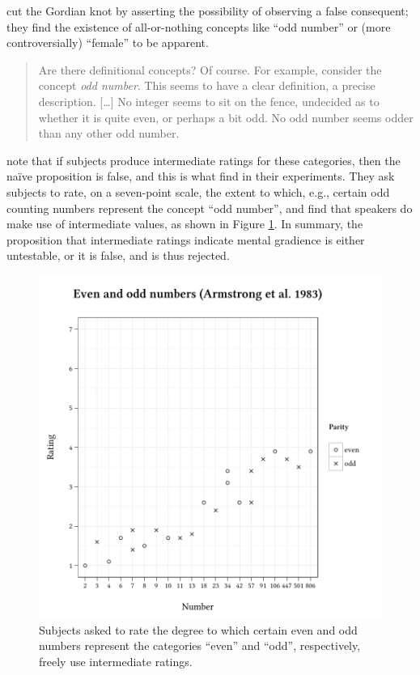\citet{Armstrong1983} cut the Gordian knot by asserting the possibility of observing a false consequent; they find the existence of all-or-nothing concepts like ``odd number'' or (more controversially) ``female'' to be apparent.

\begin{quote}
Are there definitional concepts? Of course. For example, consider the concept \emph{odd number}. This seems to have a clear definition, a precise description. [\ldots{}] No integer seems to sit on the fence, undecided as to whether it is quite even, or perhaps a bit odd. No odd number seems odder than any other odd number. \citep[274]{Armstrong1983}
\end{quote}

\citeauthor{Armstrong1983} note that if subjects produce intermediate ratings for these categories, then the naïve proposition is false, and this is what \citeauthor{Armstrong1983} find in their experiments. They ask subjects to rate, on a seven-point scale, the extent to which, e.g., certain odd counting numbers represent the concept ``odd number'', and find that speakers do make use of intermediate values, as shown in Figure \ref{agg}. In summary, the proposition that intermediate ratings indicate mental gradience is either untestable, or it is false, and is thus rejected.

\begin{figure} 
\centering
\includegraphics{agg.pdf}
\caption{Subjects asked to rate the degree to which certain even and odd numbers represent the categories ``even'' and ``odd'', respectively, freely use intermediate ratings.}
\label{agg} 
\end{figure}

